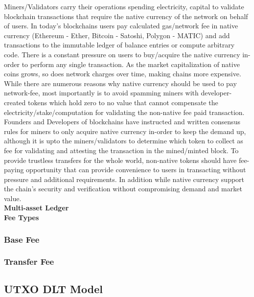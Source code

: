 \documentclass[letterpaper,11pt]{article}
\begin{document}
Miners/Validators carry their operations spending electricity, capital to validate blockchain transactions that require the native currency of the network on behalf of users. In today's blockchains users pay calculated gas/network fee in native currency (Ethereum - Ether, Bitcoin - Satoshi, Polygon - MATIC) and add transactions to the immutable ledger of balance entries or compute arbitrary code. There is a constant pressure on users to buy/acquire the native currency in-order to perform any single transaction. As the market capitalization of native coins grows, so does network charges over time, making chains more expensive. While there are numerous reasons why native currency should be used to pay network-fee, most importantly is to avoid spamming miners with developer-created tokens which hold zero to no value that cannot compensate the electricity/stake/computation for validating the non-native fee paid transaction. Founders and Developers of blockchains have instructed and written consensus rules for miners to only acquire native currency in-order to keep the demand up, although it is upto the miners/validators to determine which token to collect as fee for validating and attesting the transaction in the mined/minted block. To provide trustless transfers for the whole world, non-native tokens should have fee-paying opportunity that can provide convenience to users in transacting without pressure and additional requirements. In addition while native currency support the chain's security and verification without compromising demand and market value.\\



\textbf{Multi-asset Ledger}\\


\textbf{Fee Types}\\


\subsubsection{Base Fee}


\subsubsection{Transfer Fee}

	
\subsection{UTXO DLT Model}
\end{document}
